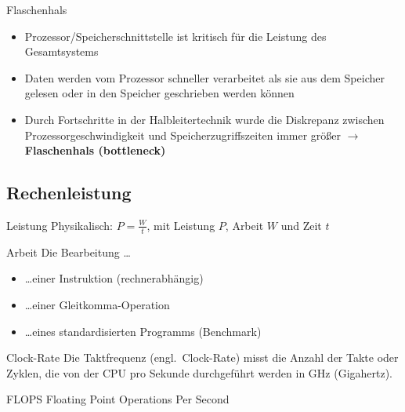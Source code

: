 \begin{defi}{Flaschenhals}
    \begin{itemize}
        \item Prozessor/Speicherschnittstelle ist kritisch für die Leistung des Gesamtsystems
        \item Daten werden vom Prozessor schneller verarbeitet als sie aus dem Speicher gelesen oder in den Speicher geschrieben werden können
        \item Durch Fortschritte in der Halbleitertechnik wurde die Diskrepanz zwischen Prozessorgeschwindigkeit und Speicherzugriffszeiten immer größer $\to$ \textbf{Flaschenhals (bottleneck)}
    \end{itemize}
\end{defi}

\subsection{Rechenleistung}\label{subsec:rechenleistung}

\begin{defi}{Leistung}
    Physikalisch: $P = \frac{W}{t}$, mit Leistung $P$, Arbeit $W$ und Zeit $t$
\end{defi}

\begin{defi}{Arbeit}
    Die Bearbeitung \ldots
    \begin{itemize}
        \item \ldots einer Instruktion (rechnerabhängig)
        \item \ldots einer Gleitkomma-Operation
        \item \ldots eines standardisierten Programms (Benchmark)
    \end{itemize}
\end{defi}

\begin{defi}[Leistungsmaß]{Clock-Rate}
    Die Taktfrequenz (engl.\ Clock-Rate) misst die Anzahl der Takte oder Zyklen, die von der CPU pro Sekunde durchgeführt werden in GHz (Gigahertz).
\end{defi}

\begin{defi}[Leistungsmaß]{FLOPS}
    Floating Point Operations Per Second
\end{defi}

